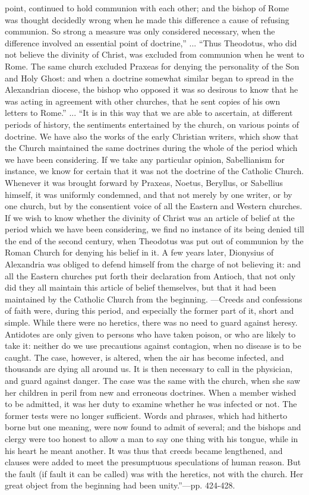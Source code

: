 point,
continued to hold communion with each other; and the bishop of Rome was
thought decidedly wrong when he made this difference a cause of refusing
communion. So strong a measure was only considered necessary, when the
difference involved an essential point of doctrine,'' ... ``Thus Theodotus, who did not believe the divinity of Christ, was excluded from
communion when he went to Rome. The same church excluded Praxeas for
denying the personality of the Son and Holy Ghost: and when a doctrine
somewhat similar began to spread in the Alexandrian diocese, the bishop
who opposed it was so desirous to know that he was acting in agreement
with other churches, that he sent copies of his own letters to Rome.''
... ``It is in this way that we are able to ascertain, at different
periods of history, the sentiments entertained by the church, on various
points of doctrine. We have also the works of the early Christian
writers, which show that the Church maintained the same doctrines during
the whole of the period which we have been considering. If we take any
particular opinion, Sabellianism for instance, we know for certain that
it was not the doctrine of the Catholic Church. Whenever it was brought
forward by Praxeas, Noetus, Beryllus, or Sabellius himself, it was
uniformly condemned, and that not merely by one writer, or by one
church, but by the consentient voice of all the Eastern and Western
churches. If we wish to know whether the divinity of Christ was an
article of belief at the period which we have been considering, we find
no instance of its being denied till the end of the second century, when
Theodotus was put out of communion by the Roman Church for denying his
belief in it. A few years later, Dionysius of Alexandria was obliged to
defend himself from the charge of not believing it: and all the Eastern
churches put forth their declaration from Antioch, that not only did
they all maintain this article of belief themselves, but that it had
been maintained by the Catholic Church from the beginning. —Creeds and
confessions of faith were, during this period, and especially the former
part of it, short and simple. While there were no heretics, there was no
need to guard against heresy. Antidotes are only given to persons who
have taken poison, or who are likely to take it: neither do we use
precautions against contagion, when no disease is to be caught. The
case, however, is altered, when the air has become infected, and
thousands are dying all around us. It is then necessary to call in the
physician, and guard against danger. The case was the same with the
church, when she saw her children in peril from new and erroneous
doctrines. When a member wished to be admitted, it was her duty to
examine whether he was infected or not. The former tests were no longer
sufficient. Words and phrases, which had hitherto borne but one meaning,
were now found to admit of several; and the bishops and clergy were too
honest to allow a man to say one thing with his tongue, while in his
heart he meant another. It was thus that creeds became lengthened, and
clauses were added to meet the presumptuous speculations of human
reason. But the fault (if fault it can be called) was with the heretics,
not with the church. Her great object from the beginning had been
unity.''—pp. 424-428.

